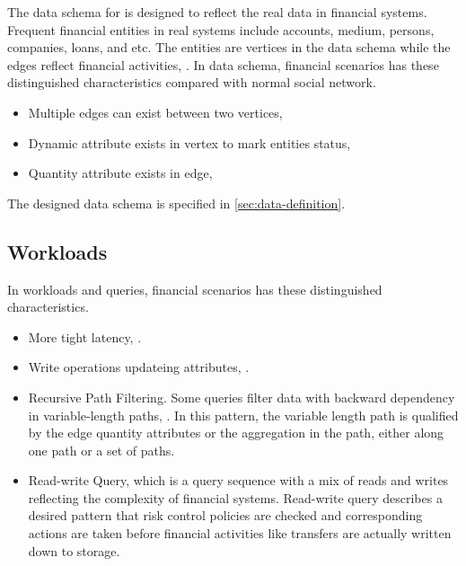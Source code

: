 The data schema for \ldbcfinbench is designed to reflect the real data in financial systems. Frequent
financial entities in real systems include accounts, medium, persons, companies, loans, and etc. The
entities are vertices in the data schema while the edges reflect financial activities, . In data schema, financial scenarios has these distinguished characteristics
compared with normal social network.
\begin{itemize}
    \item Multiple edges can exist between two vertices, 
    \item Dynamic attribute exists in vertex to mark entities status, 
    \item Quantity attribute exists in edge, 
\end{itemize}

The designed data schema is specified in \autoref{sec:data-definition}.

\subsection{Workloads}

In workloads and queries, financial scenarios has these distinguished characteristics.
\begin{itemize}
    \item More tight latency, .
    \item Write operations updateing attributes, .
    \item Recursive Path Filtering. Some queries filter data with backward dependency
          in variable-length paths, . In this pattern, the variable length path is qualified by
          the edge quantity attributes or the aggregation in the path, either along one path
          or a set of paths.
    \item Read-write Query, which is a query sequence with a mix of reads and writes reflecting the
          complexity of financial systems. Read-write query describes a desired pattern that risk control
          policies are checked and corresponding actions are taken before financial activities like
          transfers are actually written down to storage.
\end{itemize}

